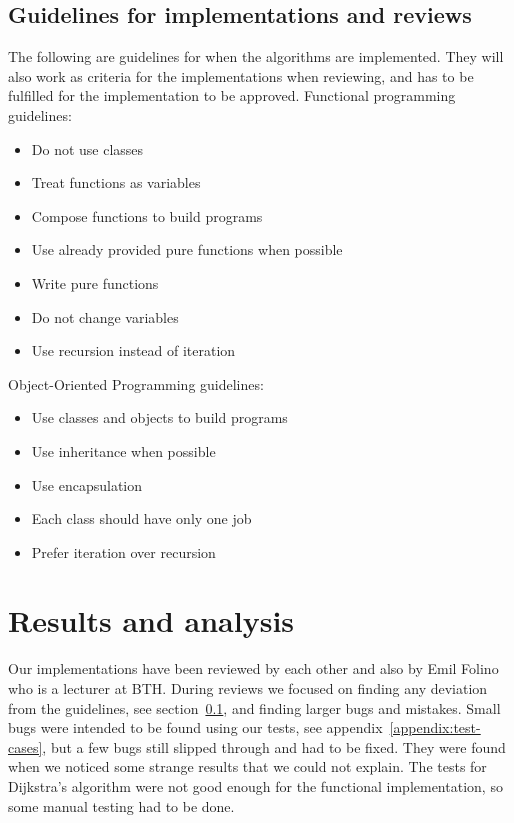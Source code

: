 \documentclass {article}
\begin{document}
\subsection{Guidelines for implementations and reviews}
\label{sec:guidelines}
The following are guidelines for when the algorithms are implemented. They will also work as criteria for the implementations when reviewing, and has to be fulfilled for the implementation to be approved.
\label{sec:paradigm-guidelines}
Functional programming guidelines:
\begin{itemize}
\item Do not use classes
\item Treat functions as variables
\item Compose functions to build programs
\item Use already provided pure functions when possible
\item Write pure functions
\item Do not change variables
\item Use recursion instead of iteration
\end{itemize}

Object-Oriented Programming guidelines:
\begin{itemize}
\item Use classes and objects to build programs
\item Use inheritance when possible
\item Use encapsulation
\item Each class should have only one job
\item Prefer iteration over recursion
\end{itemize}

\section{Results and analysis}
Our implementations have been reviewed by each other and also by Emil Folino who is a lecturer at BTH. During reviews we focused on finding any deviation from the guidelines, see section~\ref{sec:guidelines}, and finding larger bugs and mistakes. Small bugs were intended to be found using our tests, see appendix~\ref{appendix:test-cases}, but a few bugs still slipped through and had to be fixed. They were found when we noticed some strange results that we could not explain. The tests for Dijkstra's algorithm were not good enough for the functional implementation, so some manual testing had to be done.
\end{document}
